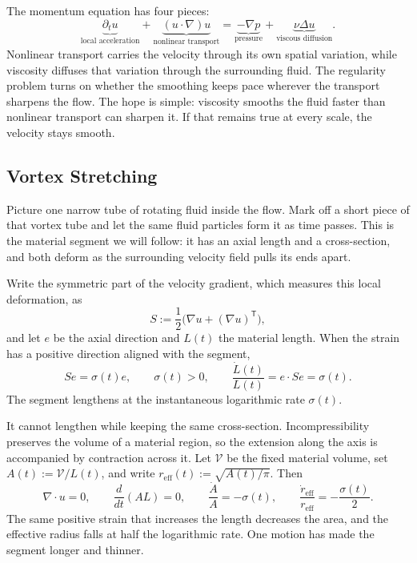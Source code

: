 
The momentum equation has four pieces:
\[
  \underbrace{\partial_t u}_{\text{local acceleration}}
  +
  \underbrace{(u\cdot\nabla)u}_{\text{nonlinear transport}}
  =
  \underbrace{-\nabla p}_{\text{pressure}}
  +
  \underbrace{\nu\Delta u}_{\text{viscous diffusion}}.
\]
Nonlinear transport carries the velocity through its own spatial variation, while viscosity diffuses that variation through the surrounding fluid.
The regularity problem turns on whether the smoothing keeps pace wherever the transport sharpens the flow.
The hope is simple: viscosity smooths the fluid faster than nonlinear transport can sharpen it.
If that remains true at every scale, the velocity stays smooth.

\subsection{Vortex Stretching}\label{sub:ThePerfectlyStretchingVortex}

Picture one narrow tube of rotating fluid inside the flow.
Mark off a short piece of that vortex tube and let the same fluid particles form it as time passes.
This is the material segment we will follow: it has an axial length and a cross-section, and both deform as the surrounding velocity field pulls its ends apart.

Write the symmetric part of the velocity gradient, which measures this local deformation, as
\[
  S:=\frac12\bigl(\nabla u+(\nabla u)^{\mathsf T}\bigr),
\]
and let \(e\) be the axial direction and \(L(t)\) the material length.
When the strain has a positive direction aligned with the segment,
\[
  Se=\sigma(t)e,
  \qquad
  \sigma(t)>0,
  \qquad
  \frac{\dot L(t)}{L(t)}
  =
  e\cdot Se
  =
  \sigma(t).
\]
The segment lengthens at the instantaneous logarithmic rate \(\sigma(t)\).

It cannot lengthen while keeping the same cross-section.
Incompressibility preserves the volume of a material region, so the extension along the axis is accompanied by contraction across it.
Let \(\mathcal V\) be the fixed material volume, set \(A(t):=\mathcal V/L(t)\), and write \(r_{\mathrm{eff}}(t):=\sqrt{A(t)/\pi}\).
Then
\[
  \nabla\cdot u=0,
  \qquad
  \frac{d}{dt}(A L)=0,
  \qquad
  \frac{\dot A}{A}=-\sigma(t),
  \qquad
  \frac{\dot r_{\mathrm{eff}}}{r_{\mathrm{eff}}}
  =
  -\frac{\sigma(t)}{2}.
\]
The same positive strain that increases the length decreases the area, and the effective radius falls at half the logarithmic rate.
One motion has made the segment longer and thinner.

